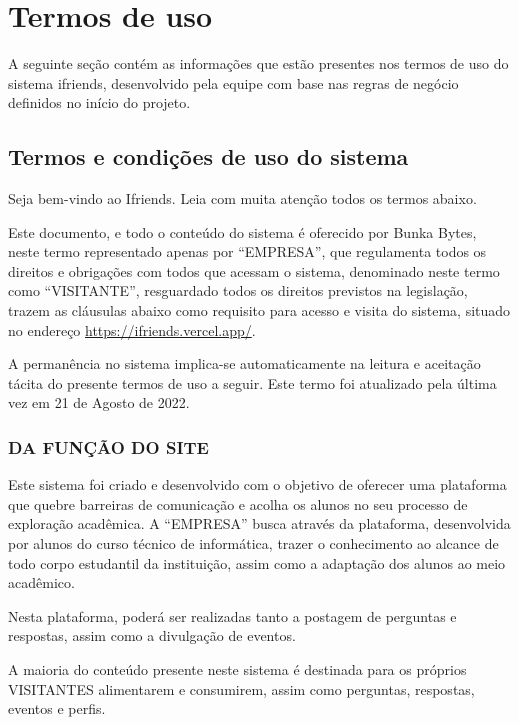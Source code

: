 \chapter{Termos de uso}
\label{termos_uso}
 A seguinte seção contém as informações que estão presentes nos termos de uso do sistema \gls{ifriends}, desenvolvido pela equipe com base nas regras de negócio definidos no início do projeto.
\section{Termos e condições de uso do sistema}
 
Seja bem-vindo ao Ifriends. Leia com muita atenção todos os termos abaixo.
 
Este documento, e todo o conteúdo do sistema é oferecido por Bunka Bytes, neste termo representado apenas por ``EMPRESA'', que regulamenta todos os direitos e obrigações com todos que acessam o sistema, denominado neste termo como ``VISITANTE'', resguardado todos os direitos previstos na legislação, trazem as cláusulas abaixo como requisito para acesso e visita do sistema, situado no endereço \href{https://ifriends.vercel.app/}{https://ifriends.vercel.app/}.

A permanência no sistema implica-se automaticamente na leitura e aceitação tácita do presente termos de uso a seguir. Este termo foi atualizado pela última vez em 21 de Agosto de 2022.
 
\subsection{DA FUNÇÃO DO SITE}
 
Este sistema foi criado e desenvolvido com o objetivo de oferecer uma plataforma que quebre barreiras de comunicação e acolha os alunos no seu processo de exploração acadêmica. A ``EMPRESA'' busca através da plataforma, desenvolvida por alunos do curso técnico de informática, trazer o conhecimento ao alcance de todo corpo estudantil da instituição, assim como a adaptação dos alunos ao meio acadêmico.

Nesta plataforma, poderá ser realizadas tanto a postagem de perguntas e respostas, assim como a divulgação de eventos.

A maioria do conteúdo presente neste sistema é destinada para os próprios VISITANTES alimentarem e consumirem, assim como perguntas, respostas, eventos e perfis.

